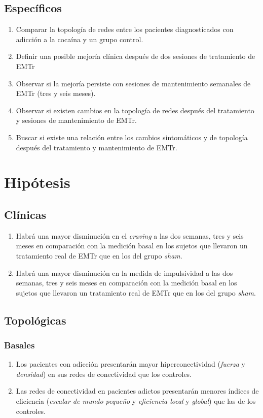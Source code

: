 \subsection{Específicos}
\begin{enumerate}[label=Específico \arabic*., left= \parindent]

    \item Comparar la topología de redes entre los pacientes diagnosticados con adicción a la cocaína y un grupo control.
    \item Definir una posible mejoría clínica después de dos sesiones de tratamiento de EMTr
    \item Observar si la mejoría persiste con sesiones de mantenimiento semanales de EMTr (tres y seis meses).
    \item Observar si existen cambios en la topología de redes después del tratamiento y sesiones de mantenimiento de EMTr.
    \item Buscar si existe una relación entre los cambios sintomáticos y de topología después del tratamiento y mantenimiento de EMTr.
\end{enumerate}

\section{Hipótesis}
\subsection{Clínicas}
\begin{enumerate}[label=Hipótesis \arabic*., left= \parindent]
    \item Habrá una mayor disminución en el \textit{craving} a las dos semanas, tres y seis meses en comparación con la medición basal en los sujetos que llevaron un tratamiento real de EMTr que en los del grupo \textit{sham}.
    \item Habrá una mayor disminución en la medida de impulsividad a las dos semanas, tres y seis meses en comparación con la medición basal en los sujetos que llevaron un tratamiento real de EMTr que en los del grupo \textit{sham}.
\end{enumerate}
\subsection{Topológicas}
    \subsubsection{Basales}
    \begin{enumerate}[resume,label=Hipótesis \arabic*., left= \parindent]
        \item Los pacientes con adicción presentarán mayor hiperconectividad (\emph{fuerza} y \emph{densidad}) en sus redes de conectividad que los controles.
        \item Las redes de conectividad en pacientes adictos presentarán menores índices de eficiencia (\emph{escalar de mundo pequeño} y \emph{eficiencia local} y \emph{global}) que las de los controles.
    \end{enumerate}
